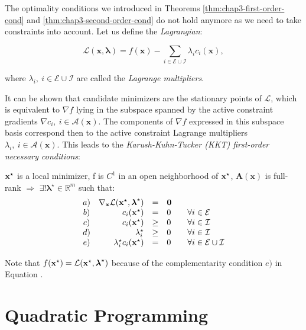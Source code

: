The optimality conditions we introduced in Theorems
\ref{thm:chap3-first-order-cond} and \ref{thm:chap3-second-order-cond}
do not hold anymore as we need to take constraints into account. Let
us define the \emph{Lagrangian}:

\begin{equation}
\mathcal{L}(\mathbf{x},\boldsymbol{\lambda}) =
f(\mathbf{x})-\sum_{i\in\mathcal{E}\cup\mathcal{I}}
\lambda_ic_i(\mathbf{x}),
\end{equation}

\noindent where $\lambda_i,~i\in \mathcal{E}\cup\mathcal{I}$ are called the
\emph{Lagrange multipliers}.

It can be shown that candidate minimizers are the stationary points of
$\mathcal{L}$, which is equivalent to $\nabla f$ lying in the subspace
spanned by the active constraint gradients $\nabla
c_i,~i\in\mathcal{A(\mathbf{x})}$. The components of $\nabla f$
expressed in this subspace basis correspond then to the active
constraint Lagrange multipliers
$\lambda_i,~i\in\mathcal{A}(\mathbf{x})$. This leads to the
\emph{Karush-Kuhn-Tucker (KKT) first-order necessary conditions}:

\begin{theorem}
\label{eq:chap3-kkt}
$\mathbf{x}^{\star}$ is a local minimizer, f is $C^1$ in an open neighborhood
of $\mathbf{x}^{\star}$, $\mathbf{A}(\mathbf{x})$ is full-rank $\Rightarrow$
$\exists! \boldsymbol{\lambda}^{\star} \in \mathbb R^m$ such that:
\[
\begin{array}{crcl}
a) & \nabla_{\mathbf{x}}\mathcal{L}(\argmin{x}, \boldsymbol{\lambda}^\star) & = & \mathbf{0} \\%
b) & c_i(\argmin{x}) & = & 0 \qquad \forall i \in \mathcal{E} \\%
c) & c_i(\argmin{x}) & \ge & 0 \qquad \forall i \in \mathcal{I}\\%
d) & \lambda_i^{\star} & \ge & 0 \qquad \forall i \in \mathcal{I}\\%
e) & \lambda_i^{\star} c_i(\argmin{x}) & = & 0 \qquad \forall i \in \mathcal{E}\cup\mathcal{I}%
\end{array}
\]
\end{theorem}

Note that $f(\mathbf{x}^{\star}) = \mathcal{L}(\mathbf{x}^{\star},
\boldsymbol{\lambda}^\star)$ because of the complementarity condition
$e)$ in Equation .

\section{Quadratic Programming}

